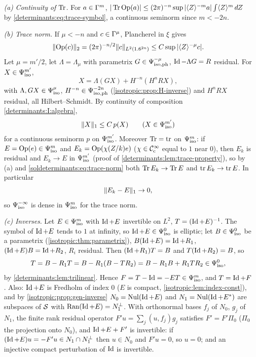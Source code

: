\emph{(a) Continuity of $\operatorname{Tr}$.} For $a\in\Gamma^{m}$, $|\operatorname{Tr}\operatorname{Op}(a)|\le(2\pi)^{-n}\sup|\langle Z\rangle^{-m}a|\int\langle Z\rangle^m\,dZ$
by \eqref{determinants:eq:trace-symbol}, a continuous seminorm since $m<-2n$.

\emph{(b) Trace norm.} If $\mu<-n$ and $c\in\Gamma^{\mu}$, Plancherel in $\xi$ gives
\begin{equation*}
  \lVert \operatorname{Op}(c)\rVert_2=(2\pi)^{-n/2}\lVert c\rVert_{L^2(1.6^{2n})}\le C\sup|\langle Z\rangle^{-\mu}c| .
\end{equation*}
Let $\mu=m'/2$, let
$\Lambda=\Lambda_\mu$ with parametrix $G\in\Psi^{-\mu}_{\mathrm{iso,ph}}$, $\operatorname{Id}-\Lambda G=R$ residual. For $X\in\Psi^{m'}_{\mathrm{iso}}$,
\begin{equation*}
  X=\Lambda(GX)+H^{-n}(H^nRX),
\end{equation*}
with $\Lambda,GX\in\Psi^{\mu}_{\mathrm{iso}}$, $H^{-n}\in\Psi^{-2n}_{\mathrm{iso,ph}}$ (\cref{isotropic:prop:H-inverse}) and $H^nRX$ residual,
all Hilbert--Schmidt. By continuity of composition \ref{determinants:I:algebra},
\begin{equation}\label{soldeterminants:eq:trace-norm}
  \lVert X\rVert_1\le C\,p(X)\qquad(X\in\Psi^{m'}_{\mathrm{iso}})
\end{equation}
for a continuous seminorm $p$ on $\Psi^{m'}_{\mathrm{iso}}$. Moreover $\operatorname{Tr}=\operatorname{tr}$ on $\Psi^{m}_{\mathrm{iso}}$: if $E=\operatorname{Op}(e)\in\Psi^{m}_{\mathrm{iso}}$
and $E_k=\operatorname{Op}(\chi(Z/k)e)$ ($\chi\in\mathcal{C}^\infty_{\mathrm{c}}$ equal to $1$ near $0$), then $E_k$ is residual and $E_k\to E$ in
$\Psi^{m'}_{\mathrm{iso}}$ (proof of \cref{determinants:lem:trace-property}), so by (a) and
\eqref{soldeterminants:eq:trace-norm} both $\operatorname{Tr} E_k\to\operatorname{Tr} E$ and $\operatorname{tr} E_k\to\operatorname{tr} E$. In particular
\begin{equation}\label{soldeterminants:eq:approx}
  \lVert E_k-E\rVert_1\to0,
\end{equation}
so $\Psi^{-\infty}_{\mathrm{iso}}$ is dense in $\Psi^{m}_{\mathrm{iso}}$ for the trace norm.

\emph{(c) Inverses.} Let $E\in\Psi^{m}_{\mathrm{iso}}$ with $\operatorname{Id}+E$ invertible on $L^2$, $T=(\operatorname{Id}+E)^{-1}$. The symbol of
$\operatorname{Id}+E$ tends to $1$ at infinity, so $\operatorname{Id}+E\in\Psi^{0}_{\mathrm{iso}}$ is elliptic; let $B\in\Psi^{0}_{\mathrm{iso}}$ be a parametrix
(\cref{isotropic:thm:parametrix}), $B(\operatorname{Id}+E)=\operatorname{Id}+R_1$, $(\operatorname{Id}+E)B=\operatorname{Id}+R_2$, $R_i$ residual. Then
$(\operatorname{Id}+R_1)T=B$ and $T(\operatorname{Id}+R_2)=B$, so
\begin{equation*}
  T=B-R_1T=B-R_1(B-TR_2)=B-R_1B+R_1TR_2\in\Psi^{0}_{\mathrm{iso}},
\end{equation*}
by \cref{determinants:lem:trilinear}. Hence $F=T-\operatorname{Id}=-ET\in\Psi^{m}_{\mathrm{iso}}$, and $T=\operatorname{Id}+F$. Also: $\operatorname{Id}+E$ is
Fredholm of index $0$ ($E$ is compact, \cref{isotropic:lem:index-const}), and by
\cref{isotropic:prop:gen-inverse} $N_0=\operatorname{Nul}(\operatorname{Id}+E)$ and $N_1=\operatorname{Nul}(\operatorname{Id}+E^*)$ are subspaces of $\mathcal{S}$ with
$\operatorname{Ran}(\operatorname{Id}+E)=N_1^\perp$. With orthonormal bases $f_j$ of $N_0$, $g_j$ of $N_1$, the finite rank residual
operator $F'u=\sum_j(u,f_j)g_j$ satisfies $F'=F'\Pi_0$ ($\Pi_0$ the projection onto $N_0$), and
$\operatorname{Id}+E+F'$ is invertible: if $(\operatorname{Id}+E)u=-F'u\in N_1\cap N_1^\perp$ then $u\in N_0$ and $F'u=0$, so $u=0$;
and an injective compact perturbation of $\operatorname{Id}$ is invertible.

